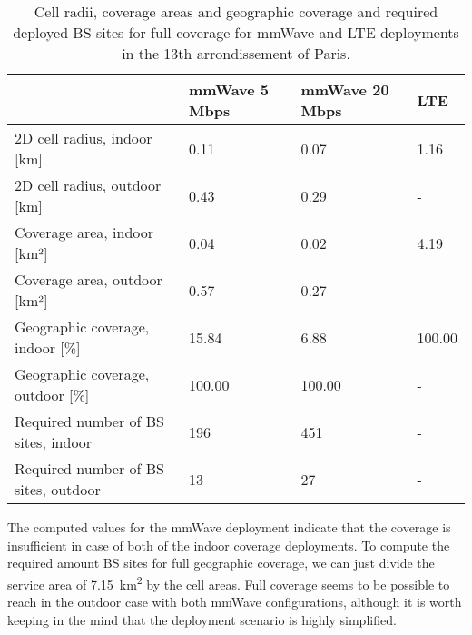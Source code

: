 \documentclass{article}
\begin{document}
\begin{table}[!htb]
    \centering
    \begin{tabular}{|l|l|l|l|}
    \hline
    \textbf{}                             & \textbf{mmWave 5 Mbps} & \textbf{mmWave 20 Mbps} & \textbf{LTE} \\ \hline
    2D cell radius, indoor {[}km{]}       & 0.11                   & 0.07                    & 1.16         \\ \hline
    2D cell radius, outdoor {[}km{]}      & 0.43                   & 0.29                    & -            \\ \hline
    Coverage area, indoor {[}km²{]}       & 0.04                   & 0.02                    & 4.19         \\ \hline
    Coverage area, outdoor {[}km²{]}      & 0.57                   & 0.27                    & -            \\ \hline
    Geographic coverage, indoor {[}\%{]}  & 15.84                  & 6.88                    & 100.00       \\ \hline
    Geographic coverage, outdoor {[}\%{]} & 100.00                 & 100.00                  & -            \\ \hline
    Required number of BS sites, indoor   & 196                    & 451                     & -            \\ \hline
    Required number of BS sites, outdoor  & 13                     & 27                      & -            \\ \hline
    \end{tabular}
    \caption{Cell radii, coverage areas and geographic coverage and required deployed BS sites for full coverage for mmWave and LTE deployments in the 13th arrondissement of Paris.}
    \label{tab:coverage}
\end{table}

The computed values for the mmWave deployment indicate that the coverage is insufficient in case of both of the indoor coverage deployments. To compute the required amount BS sites for full geographic coverage, we can just divide the service area of \SI{7.15}{\kilo\metre\squared} by the cell areas. Full coverage seems to be possible to reach in the outdoor case with both mmWave configurations, although it is worth keeping in the mind that the deployment scenario is highly simplified.
\end{document}
